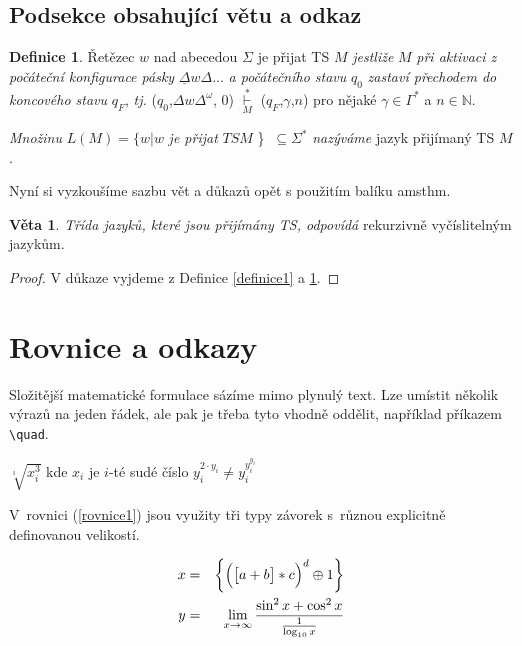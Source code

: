 \documentclass[a4paper,11pt,twocolumn]{article}
\theoremstyle{definition}
\newtheorem{definice}{Definice}[section]
\theoremstyle{definition}
\newtheorem{veta}{Věta}
\theoremstyle{definition}
\begin{document}
\subsection{Podsekce obsahující větu a odkaz}
\begin{definice}
\label{definice2}
Řetězec $w$ nad abecedou $\Sigma$ je přijat TS $M$
\emph{jestliže} $M$ \emph{při aktivaci z počáteční konfigurace pásky} $\underline{\Delta}w \Delta...$ \emph{a počátečního stavu} $q_{0}$ \emph{zastaví přechodem do koncového stavu} $q_{F}$, \emph{tj.} ($q_{0}$,$\Delta w \Delta^{\omega}$, 0) $\underset{M}{\overset{*}{\vdash}}$ ($q_{F}$,$\gamma$,$n$) pro nějaké $\gamma \in \Gamma^{*}$ a $n \in \mathbb{N}$. \par
\emph{Množinu} $L(M) = \{w | w$ \emph{je přijat} $TS M$ \} $\ \subseteq \Sigma^{*}$ \emph{nazýváme} jazyk přijímaný TS $M$. \\ \par
Nyní si vyzkoušíme sazbu vět a důkazů opět s použitím balíku {\ttfamily amsthm}.
\end{definice}

\begin{veta}
\label{veta1} \emph{Třída jazyků, které jsou přijímány TS, odpovídá} rekurzivně vyčíslitelným jazykům.
\end{veta}
\begin{proof}
V důkaze vyjdeme z Definice \ref{definice1} a \ref{definice2}.
\end{proof}

\section{Rovnice a odkazy}

Složitější matematické formulace sázíme mimo plynulý text. Lze umístit několik výrazů na jeden řádek, ale pak je třeba tyto vhodně oddělit, například příkazem \verb|\quad|.

\begin{center}
  $\sqrt[i]{x^{3}_{i}}$ \quad kde $x_{i}$ je $i$-té sudé číslo \quad $y_{i}^{2\cdot y_{i}} \neq y_{i}^{y_{i}^{y_{i}}}$
\end{center}

V~rovnici (\ref{rovnice1}) jsou využity tři typy závorek s~různou explicitně definovanou velikostí.

\begin{eqnarray}
  x &= &\bigg\{\Big(\big[a + b\big] * c\Big)^d \oplus 1\bigg\} \label{rovnice1} \\
  y &= &\lim\limits_{x \to \infty}\frac{\textup{sin}^2\,{x} + \textup{cos}^2\,{x}}{\frac{1}{\log_{10} x}}\nonumber
\end{eqnarray}
\end{document}
